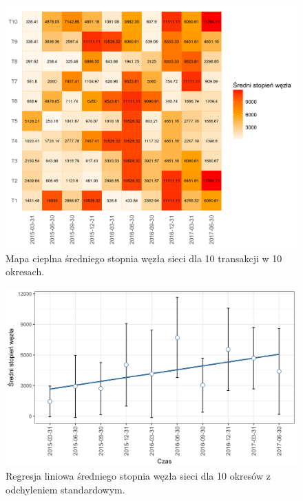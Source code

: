 \documentclass[12pt, twoside, final, openany]{mgr}
\newcommand{\chartsWidth}{0.8}
\begin{document}
\begin{figure}[H]
\centering
   \includegraphics[width=\chartsWidth\linewidth]{pictures/sredni_stopien_wezla/sredni_stopien_wezla_hm.png}
   \caption{Mapa cieplna średniego stopnia węzła sieci dla 10 transakcji w 10 okresach.}
   \label{fig:sw1} 
\end{figure}
\begin{figure}[H]
   \includegraphics[width=\chartsWidth\linewidth]{pictures/sredni_stopien_wezla/sredni_stopien_wezla_sda.png}
   \caption{Regresja liniowa średniego stopnia węzła sieci dla 10 okresów z odchyleniem standardowym.}
   \label{fig:sw2}
\end{figure}
\newpage
\end{document}

